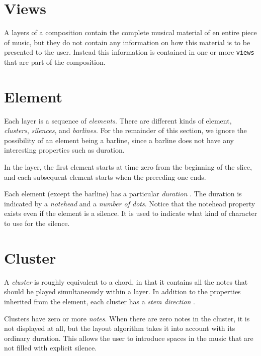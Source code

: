 \section{Views}

A layers of a composition contain the complete musical material of en
entire piece of music, but they do not contain any information on how
this material is to be presented to the user.  Instead this
information is contained in one or more \texttt{views} that are part
of the composition.

\section{Element}

Each layer is a sequence of \emph{elements}.  There are
different kinds of element, \emph{clusters},
\emph{silences}, and \emph{barlines}.
For the remainder of this section, we ignore the possibility of
an element being a barline, since a barline does not have any
interesting properties such as duration.

In the layer, the first element starts at time zero from the
beginning of the slice, and each subsequent element starts when the
preceding one ends. 

Each element (except the barline) has a particular \emph{duration}
.  The duration is indicated by a \emph{notehead}
 and a \emph{number of dots}. 
 Notice that the notehead property exists even
if the element is a silence.  It is used to indicate what kind of
character to use for the silence.

\section{Cluster}

A \emph{cluster} is roughly equivalent to a chord, in
that it contains all the notes that should be played simultaneously
within a layer.  In addition to the properties inherited from the
element, each cluster has a \emph{stem direction}  .

Clusters have zero or more \emph{notes}.  When there are zero notes in
the cluster, it is not displayed at all, but the layout algorithm
takes it into account with its ordinary duration.  This allows the
user to introduce spaces in the music that are not filled with
explicit silence. 


